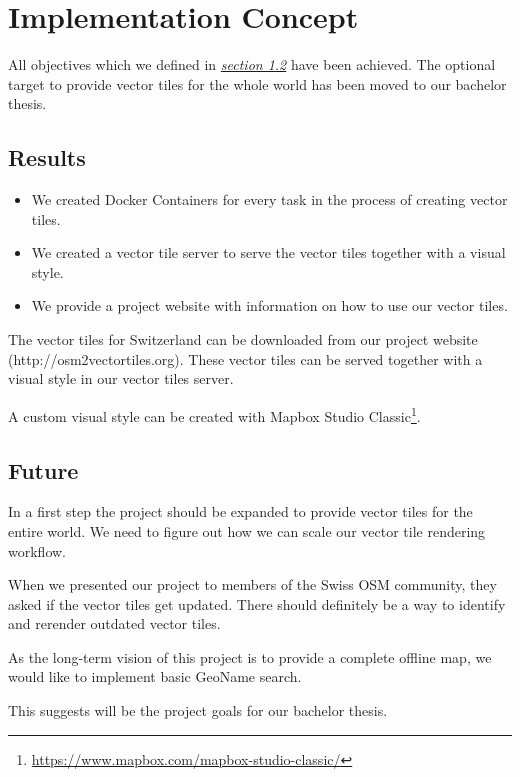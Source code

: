 \chapter{Implementation Concept}

All objectives which we defined in \hyperref[targets]{\emph{section 1.2}} have been achieved. The optional target to provide vector tiles for the whole world has been moved to our bachelor thesis.

\section{Results}

\begin{itemize}
\item
  We created Docker Containers for every task in the process of creating vector tiles.
\item
  We created a vector tile server to serve the vector tiles together with a visual style.
\item
  We provide a project website with information on how to use our vector tiles.
\end{itemize}

The vector tiles for Switzerland can be downloaded from our project website (http://osm2vectortiles.org). These vector tiles can be served together with a visual style in our vector tiles server.

A custom visual style can be created with Mapbox Studio Classic\footnote{\url{https://www.mapbox.com/mapbox-studio-classic/}}.

\section{Future}
In a first step the project should be expanded to provide vector tiles for the entire world. We need to figure out how we can scale our vector tile rendering workflow.

When we presented our project to members of the Swiss OSM community, they asked if the vector tiles get updated. There should definitely be a way to identify and rerender outdated vector tiles.

As the long-term vision of this project is to provide a complete offline map, we would like to implement basic GeoName search.

This suggests will be the project goals for our bachelor thesis.

\newpage